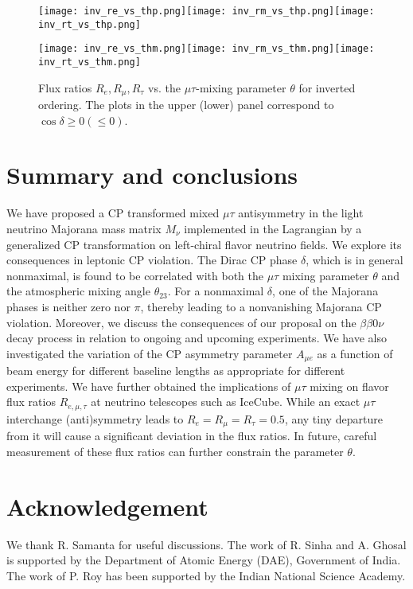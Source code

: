 \documentclass[11pt]{article}
\begin{document}
\begin{figure}[H]
\texttt{[image: inv\_re\_vs\_thp.png]}\texttt{[image: inv\_rm\_vs\_thp.png]}\texttt{[image: inv\_rt\_vs\_thp.png]}

\texttt{[image: inv\_re\_vs\_thm.png]}\texttt{[image: inv\_rm\_vs\_thm.png]}\texttt{[image: inv\_rt\_vs\_thm.png]}
\caption{Flux ratios $R_e, R_\mu, R_{\tau}$ vs. the $\mu\tau$-mixing parameter $\theta$ for inverted ordering. The plots in the upper (lower) panel correspond to $\cos\delta\geq 0(\leq 0)$.}\label{figy}
\end{figure}  
\noindent



\section{Summary and conclusions}\label{sec5} We have proposed a CP transformed mixed $\mu\tau$ antisymmetry in the light neutrino Majorana mass matrix $M_\nu$ implemented in the Lagrangian by a generalized CP transformation on left-chiral flavor neutrino fields. We explore its consequences in leptonic CP violation. The Dirac CP phase $\delta$, which is in general nonmaximal, is found to be correlated with both the $\mu\tau$ mixing parameter $\theta$ and the atmospheric mixing angle $\theta_{23}$. For a nonmaximal $\delta$, one of the Majorana phases is neither zero nor $\pi$, thereby leading to a nonvanishing Majorana CP violation. Moreover, we discuss the consequences of our proposal on the $\beta\beta0\nu$ decay process in relation to ongoing and upcoming experiments. We have also investigated the variation of the CP asymmetry parameter $A_{\mu e}$ as a function of beam energy for different baseline lengths as appropriate for different experiments. We have further obtained the implications of $\mu\tau$ mixing on flavor flux ratios $R_{e,\mu,\tau}$ at neutrino telescopes such as IceCube. While an exact $\mu\tau$ interchange (anti)symmetry leads to $R_e=R_\mu=R_\tau=0.5$, any tiny departure from it will cause a significant deviation in the flux ratios. In future, careful measurement of these flux ratios  can further constrain the parameter $\theta$. 

\section*{Acknowledgement} We thank R. Samanta for useful discussions. The work of R. Sinha and A. Ghosal is supported by the Department of Atomic Energy (DAE), Government of India. The work of P. Roy has been supported by the Indian National Science Academy.
\end{document}
